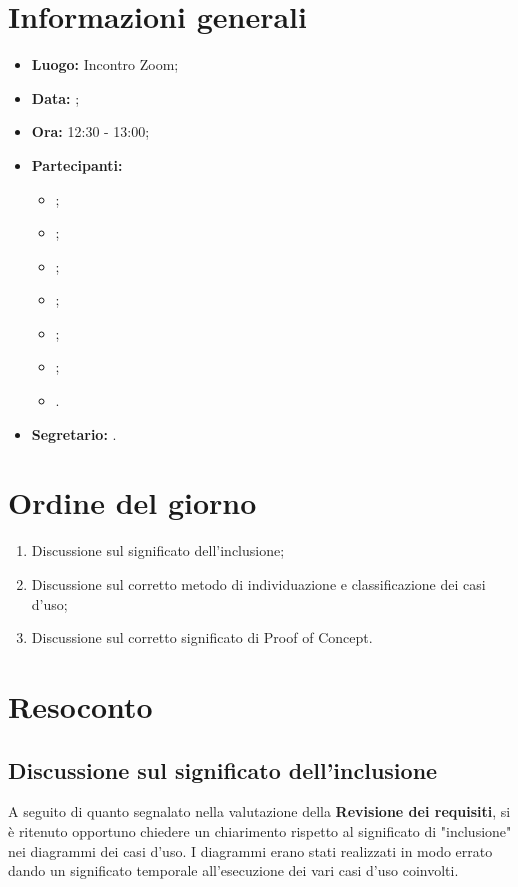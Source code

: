 \section{Informazioni generali}
\begin{itemize}
\item \textbf{Luogo:} Incontro Zoom;
\item \textbf{Data:} \Data;
\item \textbf{Ora:} 12:30 - 13:00;
\item \textbf{Partecipanti:}
	\begin{itemize}
		\item \BL{}; 
		\item \FF{};
		\item \PC{};
		\item \TG{};
		\item \TL{};
		\item \VD{};
		\item \CR{}.
	\end{itemize}
\item \textbf{Segretario:} \TG{}.
\end{itemize}

\section{Ordine del giorno}
\begin{enumerate}
	\item Discussione sul significato dell'inclusione;
	\item Discussione sul corretto metodo di individuazione e classificazione dei casi d'uso;
	\item Discussione sul corretto significato di Proof of Concept.
\end{enumerate}

\section{Resoconto}
\subsection{Discussione sul significato dell'inclusione}
A seguito di quanto segnalato nella valutazione della \textbf{Revisione dei requisiti}, si è ritenuto opportuno chiedere un chiarimento rispetto al significato di "inclusione" nei diagrammi dei casi d'uso. I diagrammi erano stati realizzati in modo errato dando un significato temporale all'esecuzione dei vari casi d'uso coinvolti.
